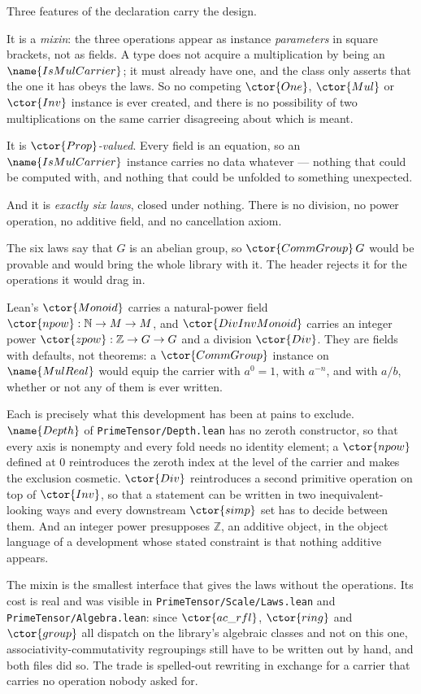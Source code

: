 Three features of the declaration carry the design.

It is a \emph{mixin}: the three operations appear as instance
\emph{parameters} in square brackets, not as fields.  A type does not acquire a
multiplication by being an $\name{IsMulCarrier}$; it must already have one, and
the class only asserts that the one it has obeys the laws.  So no competing
$\ctor{One}$, $\ctor{Mul}$ or $\ctor{Inv}$ instance is ever created, and there
is no possibility of two multiplications on the same carrier disagreeing about
which is meant.

It is \emph{$\ctor{Prop}$-valued}.  Every field is an equation, so an
$\name{IsMulCarrier}$ instance carries no data whatever --- nothing that could
be computed with, and nothing that could be unfolded to something unexpected.

And it is \emph{exactly six laws}, closed under nothing.  There is no division,
no power operation, no additive field, and no cancellation axiom.

\begin{designnote}\label{Structure:note:why-not-group}
The six laws say that $G$ is an abelian group, so $\ctor{CommGroup}\,G$ would
be provable and would bring the whole library with it.  The header rejects it
for the operations it would drag in.

Lean's $\ctor{Monoid}$ carries a natural-power field
$\ctor{npow} : \mathbb{N} \to M \to M$, and $\ctor{DivInvMonoid}$ carries an
integer power $\ctor{zpow} : \mathbb{Z} \to G \to G$ and a division
$\ctor{Div}$.  They are fields with defaults, not theorems: a $\ctor{CommGroup}$
instance on $\name{MulReal}$ would equip the carrier with $a^{0} = 1$, with
$a^{-n}$, and with $a / b$, whether or not any of them is ever written.

Each is precisely what this development has been at pains to exclude.
$\name{Depth}$ of \texttt{PrimeTensor/Depth.lean} has no zeroth constructor, so
that every axis is nonempty and every fold needs no identity element; a
$\ctor{npow}$ defined at $0$ reintroduces the zeroth index at the level of the
carrier and makes the exclusion cosmetic.  $\ctor{Div}$ reintroduces a second
primitive operation on top of $\ctor{Inv}$, so that a statement can be written
in two inequivalent-looking ways and every downstream $\ctor{simp}$ set has to
decide between them.  And an integer power presupposes $\mathbb{Z}$, an
additive object, in the object language of a development whose stated
constraint is that nothing additive appears.

The mixin is the smallest interface that gives the laws without the
operations.  Its cost is real and was visible in
\texttt{PrimeTensor/Scale/Laws.lean} and
\texttt{PrimeTensor/Algebra.lean}: since $\ctor{ac\_rfl}$, $\ctor{ring}$ and
$\ctor{group}$ all dispatch on the library's algebraic classes and not on this
one, associativity-commutativity regroupings still have to be written out by
hand, and both files did so.  The trade is spelled-out rewriting in exchange
for a carrier that carries no operation nobody asked for.
\end{designnote}

